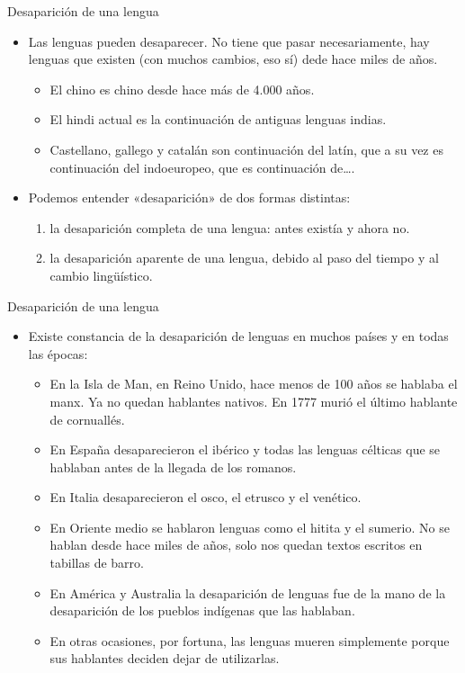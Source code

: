 \documentclass[handout]{beamer}
\begin{document}
\begin{frame}{Desaparición de una lengua}
\begin{itemize}
	\item Las lenguas pueden desaparecer. No tiene que pasar necesariamente, hay lenguas que existen (con muchos cambios, eso sí) dede hace miles de años.
	\begin{itemize}
		\item El chino es chino desde hace más de 4.000 años.
		\item El hindi actual es la continuación de antiguas lenguas indias.
		\item Castellano, gallego y catalán son continuación del latín, que a su vez es continuación del indoeuropeo, que es continuación de\ldots.
	\end{itemize}
	\item Podemos entender «desaparición» de dos formas distintas:
	\begin{enumerate}
		\item la desaparición completa de una lengua: antes existía y ahora no.
		\item la desaparición aparente de una lengua, debido al paso del tiempo y al cambio lingüístico.
	\end{enumerate}
\end{itemize}
\end{frame}

\begin{frame}{Desaparición de una lengua}

\begin{itemize}
	\item Existe constancia de la desaparición de lenguas en muchos países y en todas las épocas: 
	\begin{itemize}
		\item En la Isla de Man, en Reino Unido, hace menos de 100 años se hablaba el manx. Ya no quedan hablantes nativos. En 1777 murió el último hablante de cornuallés.
		\item En España desaparecieron el ibérico y todas las lenguas célticas que se hablaban antes de la llegada de los romanos.
		\item En Italia desaparecieron el osco, el etrusco y el venético.
		\item En Oriente medio se hablaron lenguas como el hitita y el sumerio. No se hablan desde hace miles de años, solo nos quedan textos escritos en tabillas de barro.
		\item En América y Australia la desaparición de lenguas fue de la mano de la desaparición de los pueblos indígenas que las hablaban.
		\item En otras ocasiones, por fortuna, las lenguas mueren simplemente porque sus hablantes deciden dejar de utilizarlas. 
	\end{itemize}
\end{itemize}
\end{frame}
\end{document}

